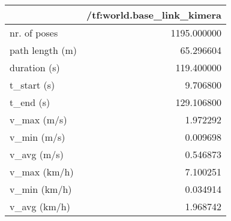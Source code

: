 \begin{tabular}{lr}
\toprule
{} &  /tf:world.base\_link\_kimera \\
\midrule
nr. of poses    &                 1195.000000 \\
path length (m) &                   65.296604 \\
duration (s)    &                  119.400000 \\
t\_start (s)     &                    9.706800 \\
t\_end (s)       &                  129.106800 \\
v\_max (m/s)     &                    1.972292 \\
v\_min (m/s)     &                    0.009698 \\
v\_avg (m/s)     &                    0.546873 \\
v\_max (km/h)    &                    7.100251 \\
v\_min (km/h)    &                    0.034914 \\
v\_avg (km/h)    &                    1.968742 \\
\bottomrule
\end{tabular}

